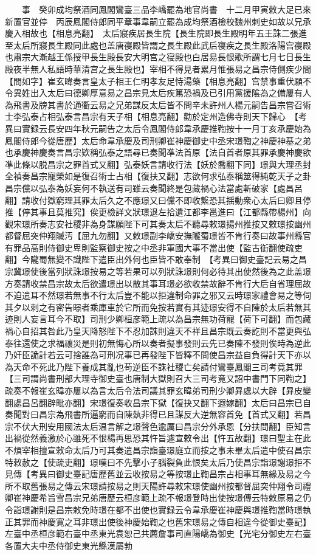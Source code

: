 　　事　癸卯成均祭酒同鳳閣鸞臺三品李嶠罷為地官尚書　十二月甲寅敕大足已來新置官並停　丙辰鳳閣侍郎同平章事韋嗣立罷為成均祭酒檢校魏州刺史如故以兄承慶入相故也【相息亮翻】　太后寢疾居長生院【長生院即長生殿明年五王誅二張進至太后所寢長生殿同此處也盖唐寑殿皆謂之長生殿此武后寑疾之長生殿洛陽宫寑殿也肅宗大漸越王係授甲長生殿長安大明宫之寑殿也白居易長恨歌所謂七月七日長生殿夜半無人私語時華清宫之長生殿也】宰相不得見者累月惟張易之昌宗侍側疾少間【間如字】崔玄暐奏言皇太子相王仁明孝友足恃湯藥【相息亮翻】宫禁事重伏願不令異姓出入太后曰德卿厚意易之昌宗見太后疾篤恐禍及已引用黨援隂為之備屢有人為飛書及牓其書於通衢云易之兄弟謀反太后皆不問辛未許州人楊元嗣告昌宗嘗召術士李弘泰占相弘泰言昌宗有天子相【相息亮翻】勸於定州造佛寺則天下歸心　【考異曰實録云長安四年秋元嗣告之太后令鳳閣侍郎韋承慶推鞫按十一月丁亥承慶始為鳳閣侍郎今從唐歷】太后命韋承慶及司刑卿崔神慶御史中丞宋璟鞫之神慶神基之弟也承慶神慶奏言昌宗欵稱弘泰之語尋已奏聞凖法首原【法自首者原其罪承慶神慶欲凖此條以脱昌宗之罪首式又翻】弘泰妖言請收行法【妖於喬翻下同】璟與大理丞封全禎奏昌宗寵榮如是復召術士占相【復扶又翻】志欲何求弘泰稱筮得純乾天子之卦昌宗儻以弘泰為妖妄何不執送有司雖云奏聞終是包藏禍心法當處斬破家【處昌呂翻】請收付獄窮理其罪太后久之不應璟又曰儻不即收繫恐其揺動衆心太后曰卿且停推【停其事且莫推究】俟更檢詳文狀璟退左拾遺江都李邕進曰【江都縣帶楊州】向觀宋璟所奏志安社稷非為身謀願陛下可其奏太后不聽尋敕璟揚州推按又敕璟按幽州都督屈突仲翔贓汚【屈九勿翻】又敕璟副李嶠安撫隴蜀璟皆不肯行奏曰故事州縣官有罪品高則侍御史卑則監察御史按之中丞非軍國大事不當出使【監古衘翻使疏吏翻】今隴蜀無變不識陛下遣臣出外何也臣皆不敢奉制　【考異曰御史臺記云易之昌宗冀璟使後當列狀誅璟按易之等若果可以列狀誅璟則何必待其出使然後為之此盖璟方奏請收禁昌宗故太后欲遣璟出以散其事耳璟必欲收禁故辭不肯行大后自省理屈故不迫遣耳不然璟若無事不行太后豈不能以拒違制命罪之邪又云時璟家禮會易之等伺其夕以刺之有密告暻者乘庫車於它所而免按若實有其迹璟安得不自陳於太后若無其迹則人妄言耳今不取】司刑少卿桓彦範上疏以為昌宗無功荷寵【荷下可翻】而包藏禍心自招其咎此乃皇天降怒陛下不忍加誅則違天不祥且昌宗既云奏訖則不當更與弘泰往還使之求福禳災是則初無悔心所以奏者擬事發則云先已奏陳不發則俟時為逆此乃奸臣詭計若云可捨誰為可刑况事已再發陛下皆釋不問使昌宗益自負得計天下亦以為天命不死此乃陛下養成其亂也苟逆臣不誅社稷亡矣請付鸞臺鳳閣三司考竟其罪【三司謂尚書刑部大理寺御史臺也唐制大獄則召大三司考竟又詔中書門下同鞫之】疏奏不報崔玄暐亦屢以為言太后令法司議其罪玄暐弟司刑少卿昪處以大辟【昪皮變翻處昌呂翻辟毗亦翻】宋璟復奏收昌宗下獄【復抉又翻下遐嫁翻】太后曰昌宗已自奏聞對曰昌宗為飛書所逼窮而自陳埶非得已且謀反大逆無容首免【首式又翻】若昌宗不伏大刑安用國法太后温言解之璟聲色逾厲曰昌宗分外承恩【分扶問翻】臣知言出禍從然義激於心雖死不恨楊再思恐其忤旨遽宣敕令出【忤五故翻】璟曰聖主在此不煩宰相擅宣敕命太后乃可其奏遣昌宗詣臺璟庭立而按之事未畢太后遣中使召昌宗特敕赦之【使疏吏翻】璟嘆曰不先擊小子腦裂負此恨矣太后乃使昌宗詣璟謝璟拒不見傳【考異曰御史臺記唐歷舊並云收按易之等按璟止鞫昌宗占相事耳無緣及易之今所不取舊張易之傳云宋璟請按易之則天陽許尋敕宋璟使幽州按都督屈突仲翔令司禮卿崔神慶希旨雪昌宗兄弟唐歷云桓彦範上疏不報璟登時出使按璟傳云特敕原易之仍令詣璟謝則是昌宗敕免時璟在都不出使也實録云令韋承慶崔神慶與璟推鞫當時璟執正其罪而神慶寛之耳非璟出使後神慶始鞫之也舊宋璟易之傳自相違今從御史臺記】左臺中丞桓彦範右臺中丞東光袁恕己共薦詹事司直陽嶠為御史【光宅分御史左右臺各置大夫中丞侍御史東光縣漢屬勃